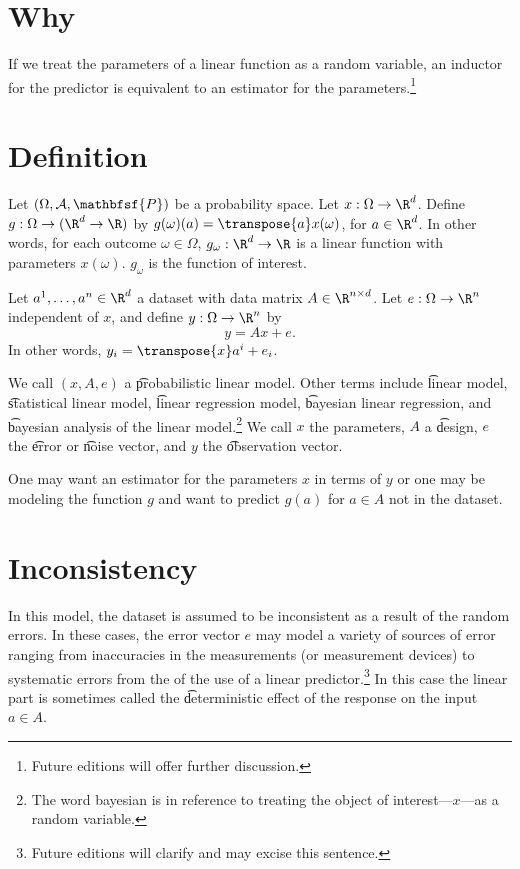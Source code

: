 

\section*{Why}

If we treat the parameters of a linear function as a random variable, an inductor for the predictor is equivalent to an estimator for the parameters.\footnote{Future editions will offer further discussion.}

\section*{Definition}

Let $(\Omega , \mathcal{A} , \mathbfsf{P} )$ be a probability space.
Let $x: \Omega  \to \R ^d$.
Define $g: \Omega  \to (\R ^d \to \R )$ by $g(\omega )(a) = \transpose{a}x(\omega )$, for $a \in \R ^d$.
In other words, for each outcome $\omega  \in \Omega $, $g_\omega : \R ^d \to \R $ is a linear function with parameters $x(\omega )$.
$g_\omega $ is the function of interest.

Let $a^1, \dots , a^n \in \R ^d$ a dataset with data matrix $A \in \R ^{n \times d}$.
Let $e: \Omega  \to \R ^n$ independent of $x$, and define $y: \Omega  \to \R ^n$ by
    \[
y = Ax + e.
    \]
In other words, $y_i = \transpose{x}a^i + e_i$.

We call $(x, A, e)$ a \t{probabilistic linear model}.
Other terms include \t{linear model}, \t{statistical linear model}, \t{linear regression model}, \t{bayesian linear regression}, and \t{bayesian analysis of the linear model}.\footnote{The word bayesian is in reference to treating the object of interest---$x$---as a random variable.}
We call $x$ the parameters, $A$ a \t{design}, $e$ the \t{error} or \t{noise} vector, and $y$ the \t{observation} vector.

One may want an estimator for the parameters $x$ in terms of $y$ or one may be modeling the function $g$ and want to predict $g(a)$ for $a \in A$ not in the dataset.

\section*{Inconsistency}

In this model, the dataset is assumed to be inconsistent as a result of the random errors.
In these cases, the error vector $e$ may model a variety of sources of error ranging from inaccuracies in the measurements (or measurement devices) to systematic errors from the  of the use of a linear predictor.\footnote{Future editions will clarify and may excise this sentence.}
In this case the linear part is sometimes called the \t{deterministic effect} of the response on the input $a \in A$.


